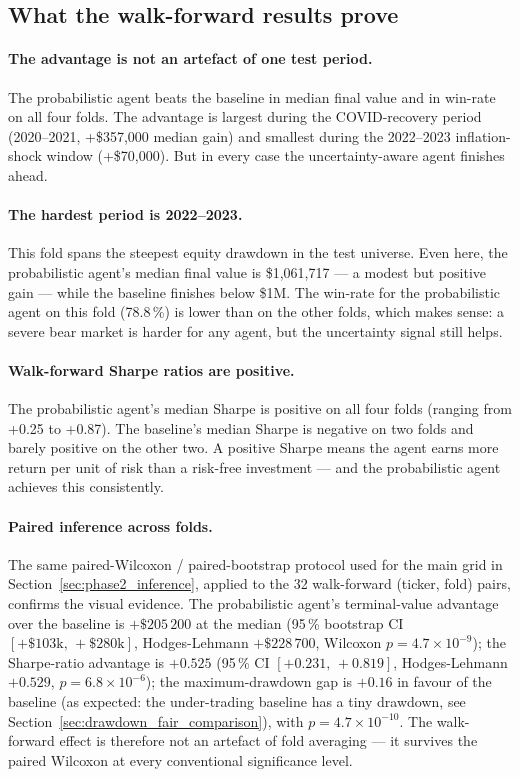\subsection{What the walk-forward results prove}
\label{sec:wf_interpretation}

\paragraph{The advantage is not an artefact of one test period.} The probabilistic agent beats the baseline in median final value and in win-rate on all four folds. The advantage is largest during the COVID-recovery period (2020--2021, +\$357,000 median gain) and smallest during the 2022--2023 inflation-shock window (+\$70,000). But in every case the uncertainty-aware agent finishes ahead.

\paragraph{The hardest period is 2022--2023.} This fold spans the steepest equity drawdown in the test universe. Even here, the probabilistic agent's median final value is \$1,061,717 --- a modest but positive gain --- while the baseline finishes below \$1M. The win-rate for the probabilistic agent on this fold (78.8\,\%) is lower than on the other folds, which makes sense: a severe bear market is harder for any agent, but the uncertainty signal still helps.

\paragraph{Walk-forward Sharpe ratios are positive.} The probabilistic agent's median Sharpe is positive on all four folds (ranging from +0.25 to +0.87). The baseline's median Sharpe is negative on two folds and barely positive on the other two. A positive Sharpe means the agent earns more return per unit of risk than a risk-free investment --- and the probabilistic agent achieves this consistently.

\paragraph{Paired inference across folds.} The same paired-Wilcoxon / paired-bootstrap protocol used for the main grid in Section~\ref{sec:phase2_inference}, applied to the 32 walk-forward (ticker, fold) pairs, confirms the visual evidence. The probabilistic agent's terminal-value advantage over the baseline is $+\$205\,200$ at the median (95\,\% bootstrap CI $[+\$103\text{k},\,+\$280\text{k}]$, Hodges-Lehmann $+\$228\,700$, Wilcoxon $p = 4.7 \times 10^{-9}$); the Sharpe-ratio advantage is $+0.525$ (95\,\% CI $[+0.231,\,+0.819]$, Hodges-Lehmann $+0.529$, $p = 6.8 \times 10^{-6}$); the maximum-drawdown gap is $+0.16$ in favour of the baseline (as expected: the under-trading baseline has a tiny drawdown, see Section~\ref{sec:drawdown_fair_comparison}), with $p = 4.7 \times 10^{-10}$. The walk-forward effect is therefore not an artefact of fold averaging --- it survives the paired Wilcoxon at every conventional significance level.

